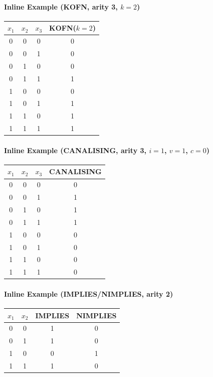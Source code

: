 \paragraph{Inline Example (KOFN, arity 3, $k=2$)}
\begin{center}
\begin{tabular}{ccc|c}
\toprule
$x_1$ & $x_2$ & $x_3$ & KOFN($k=2$) \\
\midrule
0 & 0 & 0 & 0 \\
0 & 0 & 1 & 0 \\
0 & 1 & 0 & 0 \\
0 & 1 & 1 & 1 \\
1 & 0 & 0 & 0 \\
1 & 0 & 1 & 1 \\
1 & 1 & 0 & 1 \\
1 & 1 & 1 & 1 \\
\bottomrule
\end{tabular}
\end{center}
\paragraph{Inline Example (CANALISING, arity 3, $i=1$, $v=1$, $c=0$)}
\begin{center}
\begin{tabular}{ccc|c}
\toprule
$x_1$ & $x_2$ & $x_3$ & CANALISING \\
\midrule
0 & 0 & 0 & 0 \\
0 & 0 & 1 & 1 \\
0 & 1 & 0 & 1 \\
0 & 1 & 1 & 1 \\
1 & 0 & 0 & 0 \\
1 & 0 & 1 & 0 \\
1 & 1 & 0 & 0 \\
1 & 1 & 1 & 0 \\
\bottomrule
\end{tabular}
\end{center}
\paragraph{Inline Example (IMPLIES/NIMPLIES, arity 2)}
\begin{center}
\begin{tabular}{cc|cc}
\toprule
$x_1$ & $x_2$ & IMPLIES & NIMPLIES \\
\midrule
0 & 0 & 1 & 0 \\
0 & 1 & 1 & 0 \\
1 & 0 & 0 & 1 \\
1 & 1 & 1 & 0 \\
\bottomrule
\end{tabular}
\end{center}
